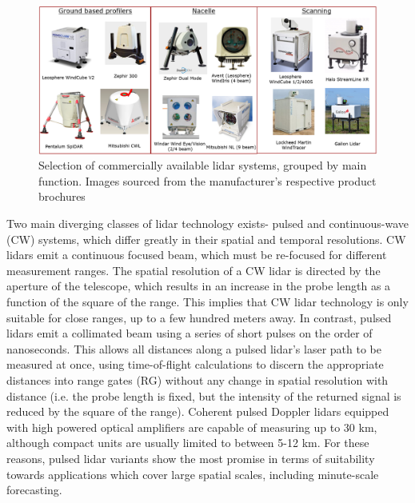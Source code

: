 \begin{figure}[htbp]
    \centering
        \includegraphics[width=1.0\textwidth]{graphics/intro/lidars.png}
    \caption{Selection of commercially available lidar systems, grouped by main function. Images sourced from the manufacturer's respective product brochures}
    \label{fig:lidars}
\end{figure}

Two main diverging classes of lidar technology exists- pulsed and continuous-wave (CW) systems, which differ greatly in their spatial and temporal resolutions. CW lidars emit a continuous focused beam, which must be re-focused for different measurement ranges. The spatial resolution of a CW lidar is directed by the aperture of the telescope, which results in an increase in the probe length as a function of the square of the range. This implies that CW lidar technology is only suitable for close ranges, up to a few hundred meters away. In contrast, pulsed lidars emit a collimated beam using a series of short pulses on the order of nanoseconds. This allows all distances along a pulsed lidar's laser path to be measured at once, using time-of-flight calculations to discern the appropriate distances into range gates (RG) without any change in spatial resolution with distance (i.e. the probe length is fixed, but the intensity of the returned signal is reduced by the square of the range). Coherent pulsed Doppler lidars equipped with high powered optical amplifiers are capable of measuring up to 30 km, although compact units are usually limited to between 5-12 km. For these reasons, pulsed lidar variants show the most promise in terms of suitability towards applications which cover large spatial scales, including minute-scale forecasting.

\clearpage
